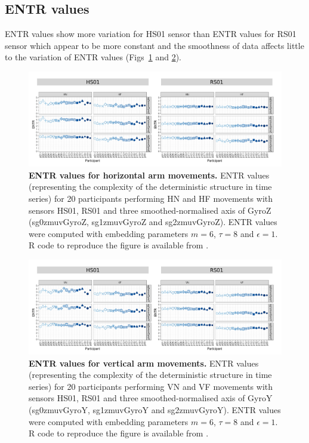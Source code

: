 

\subsection{ENTR values}
ENTR values show more variation for HS01 sensor than ENTR values for RS01 sensor
which appear to be more constant and the smoothness of data affects little 
to the variation of ENTR values (Figs~\ref{fig:entr_aH} and \ref{fig:entr_aV}).
\begin{figure}[!h]
\centering
\includegraphics[width=1.0\textwidth]{entr_aH}
    \caption{
	{\bf ENTR values for horizontal arm movements.}
    	ENTR values (representing the complexity of the deterministic structure in time series) for 
	20 participants performing HN and HF movements
	with sensors HS01, RS01 and three smoothed-normalised axis 
	of GyroZ (sg0zmuvGyroZ, sg1zmuvGyroZ and sg2zmuvGyroZ).
	ENTR values were computed with 
	embedding parameters $m=6$, $\tau=8$ and $\epsilon=1$.
	R code to reproduce the figure is available from \cite{hwum2018}.
        }
    \label{fig:entr_aH}
\end{figure}
\begin{figure}[!h]
\centering
\includegraphics[width=1.0\textwidth]{entr_aV}
    \caption{
	{\bf ENTR values for vertical arm movements.}
    	ENTR values (representing the complexity of the deterministic structure in time series) for 
	20 participants performing VN and VF movements
	with sensors HS01, RS01 and three smoothed-normalised axis 
	of GyroY (sg0zmuvGyroY, sg1zmuvGyroY and sg2zmuvGyroY).
	ENTR values were computed with 
	embedding parameters $m=6$, $\tau=8$ and $\epsilon=1$.
	R code to reproduce the figure is available from \cite{hwum2018}.
        }
    \label{fig:entr_aV}
\end{figure}



